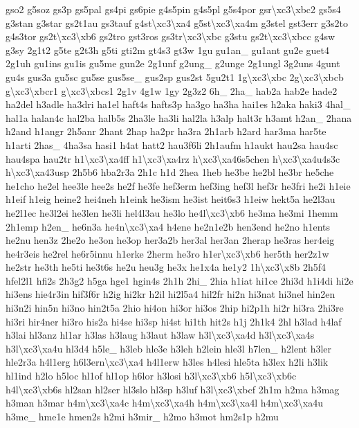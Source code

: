 \begin{DoxyCompactItemize}
gso2 g5soz gs3p gs5pal gs4pi gs6pie g4s5pin g4s5pl g5s4por gsr\textbackslash{}xc3\textbackslash{}xbc2 gs5s4 g3stan g3star gs2t1au gs3tauf g4st\textbackslash{}xc3\textbackslash{}xa4 g5st\textbackslash{}xc3\textbackslash{}xa4m g3stel gst3err g3s2to g4s3tor gs2t\textbackslash{}xc3\textbackslash{}xb6 gs2tro gst3ros gs3tr\textbackslash{}xc3\textbackslash{}xbc g3stu gs2t\textbackslash{}xc3\textbackslash{}xbcc g4sw g3sy 2g1t2 g5te g2t3h g5ti gti2m gt4s3 gt3w 1gu gu1an\-\_\- gu1ant gu2e guet4 2g1uh gu1ins gu1is gu5me gun2e 2g1unf g2ung\-\_\- g2unge 2g1ungl 3g2uns 4gunt gu4s gus3a gu5sc gu5se gus5se\-\_\- gus2sp gus2st 5gu2t1 1g\textbackslash{}xc3\textbackslash{}xbc 2g\textbackslash{}xc3\textbackslash{}xbcb g\textbackslash{}xc3\textbackslash{}xbcr1 g\textbackslash{}xc3\textbackslash{}xbcs1 2g1v 4g1w 1gy 2g3z2 6h\-\_\- 2ha\-\_\- hab2a hab2e hade2 ha2del h3adle ha3dri ha1el haft4s hafts3p ha3go ha3ha hai1es h2aka haki3 4hal\-\_\- hal1a halan4c hal2ba halb5s 2ha3le ha3li hal2la h3alp halt3r h3amt h2an\-\_\- 2hana h2and h1angr 2h5anr 2hant 2hap ha2pr ha3ra 2h1arb h2ard har3ma har5te h1arti 2has\-\_\- 4ha3sa hasi1 h4at hatt2 hau3f6li 2h1aufm h1aukt hau2sa hau4sc hau4spa hau2tr h1\textbackslash{}xc3\textbackslash{}xa4ff h1\textbackslash{}xc3\textbackslash{}xa4rz h\textbackslash{}xc3\textbackslash{}xa46s5chen h\textbackslash{}xc3\textbackslash{}xa4u4s3c h\textbackslash{}xc3\textbackslash{}xa43usp 2h5b6 hba2r3a 2h1c h1d 2hea 1heb he3be he2bl he3br he5che he1cho he2el hee3le hee2s he2f he3fe hef3erm hef3ing hef3l hef3r he3fri he2i h1eie h1eif h1eig heine2 hei4neh h1eink he3ism he3ist heit6s3 h1eiw hekt5a he2l3au he2l1ec he3l2ei he3len he3li hel4l3au he3lo he4l\textbackslash{}xc3\textbackslash{}xb6 he3ma he3mi 1hemm 2h1emp h2en\-\_\- he6n3a he4n\textbackslash{}xc3\textbackslash{}xa4 h4ene he2n1e2b hen3end he2no h1ents he2nu hen3z 2he2o he3on he3op her3a2b her3al her3an 2herap he3ras her4eig he4r3eis he2rel he6r5innu h1erke 2herm he3ro h1er\textbackslash{}xc3\textbackslash{}xb6 her5th her2z1w he2str he3th he5ti he3t6s he2u heu3g he3x he1x4a he1y2 1h\textbackslash{}xc3\textbackslash{}x8b 2h5f4 hfel2l1 hfi2s 2h3g2 h5ga hge1 hgin4s 2h1h 2hi\-\_\- 2hia h1iat hi1ce 2hi3d h1i4di hi2e hi3ens hie4r3in hif3f6r h2ig hi2kr h2il hi2l5a4 hil2fr hi2n hi3nat hi3nel hin2en hi3n2i hin5n hi3no hin2t5a 2hio hi4on hi3or hi3os 2hip hi2p1h hi2r hi3ra 2hi3re hi3ri hir4ner hi3ro his2a hi4se hi3sp hi4st hi1th hit2s h1j 2h1k4 2hl h3lad h4laf h3lai hl3anz hl1ar h3las h3laug h3laut h3law h3l\textbackslash{}xc3\textbackslash{}xa4d h3l\textbackslash{}xc3\textbackslash{}xa4s h3l\textbackslash{}xc3\textbackslash{}xa4u hl3d4 h5le\-\_\- h3leb hle3e h3leh h2lein hle3l h7len\-\_\- h2lent h3ler hle2r3a h4l1erg h6l3ern\textbackslash{}xc3\textbackslash{}xa4 h4l1erw h3les h4lesi hle5ta h3lex h2li h3lik hl1ind h2lo h5loc hl1of hl1op h6lor h3losi h3l\textbackslash{}xc3\textbackslash{}xb6 h5l\textbackslash{}xc3\textbackslash{}xb6c h4l\textbackslash{}xc3\textbackslash{}xb6s hl2san hl2ser hl3slo hl3sp h3luf h3l\textbackslash{}xc3\textbackslash{}xbcf 2h1m h2ma h3mag h3man h3mar h4m\textbackslash{}xc3\textbackslash{}xa4c h4m\textbackslash{}xc3\textbackslash{}xa4h h4m\textbackslash{}xc3\textbackslash{}xa4l h4m\textbackslash{}xc3\textbackslash{}xa4u h3me\-\_\- hme1e hmen2s h2mi h3mir\-\_\- h2mo h3mot hm2s1p h2mu 
\end{DoxyCompactItemize}
